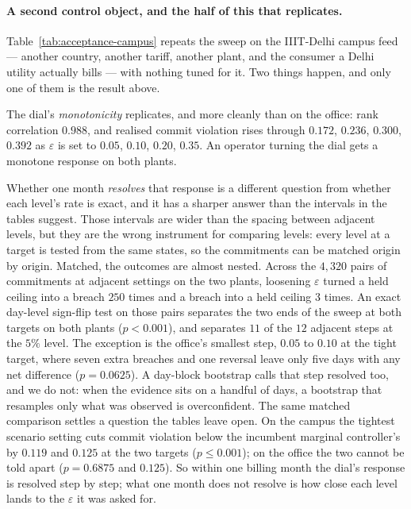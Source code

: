 

\paragraph{A second control object, and the half of this that replicates.}
Table~\ref{tab:acceptance-campus} repeats the sweep on the IIIT-Delhi campus
feed --- another country, another tariff, another plant, and the consumer a
Delhi utility actually bills --- with nothing tuned for it. Two things happen,
and only one of them is the result above.

The dial's \emph{monotonicity} replicates, and more cleanly than on the office:
rank correlation $0.988$, and realised commit violation rises through $0.172$,
$0.236$, $0.300$, $0.392$ as $\varepsilon$ is set to $0.05$, $0.10$, $0.20$,
$0.35$. An operator turning the dial gets a monotone response on both plants.

Whether one month \emph{resolves} that response is a different question from
whether each level's rate is exact, and it has a sharper answer than the
intervals in the tables suggest. Those intervals are wider than the spacing
between adjacent levels, but they are the wrong instrument for comparing
levels: every level at a target is tested from the same states, so the
commitments can be matched origin by origin. Matched, the outcomes are almost
nested. Across the $4{,}320$ pairs of commitments at adjacent settings on the
two plants, loosening $\varepsilon$ turned a held ceiling into a breach $250$
times and a breach into a held ceiling $3$ times. An exact day-level sign-flip
test on those pairs separates the two ends of the sweep at both targets on both
plants ($p < 0.001$), and separates $11$ of the $12$ adjacent steps at the
$5\%$ level. The exception is the office's smallest step, $0.05$ to $0.10$ at
the tight target, where seven extra breaches and one reversal leave only five
days with any net difference ($p = 0.0625$). A day-block bootstrap calls that
step resolved too, and we do not: when the evidence sits on a handful of days,
a bootstrap that resamples only what was observed is overconfident. The same
matched comparison settles a question the tables leave open. On the campus the
tightest scenario setting cuts commit violation below the incumbent marginal
controller's by $0.119$ and $0.125$ at the two targets ($p \leq 0.001$); on the
office the two cannot be told apart ($p = 0.6875$ and $0.125$). So within one billing month the
dial's response is resolved step by step; what one month does not resolve is
how close each level lands to the $\varepsilon$ it was asked for.

